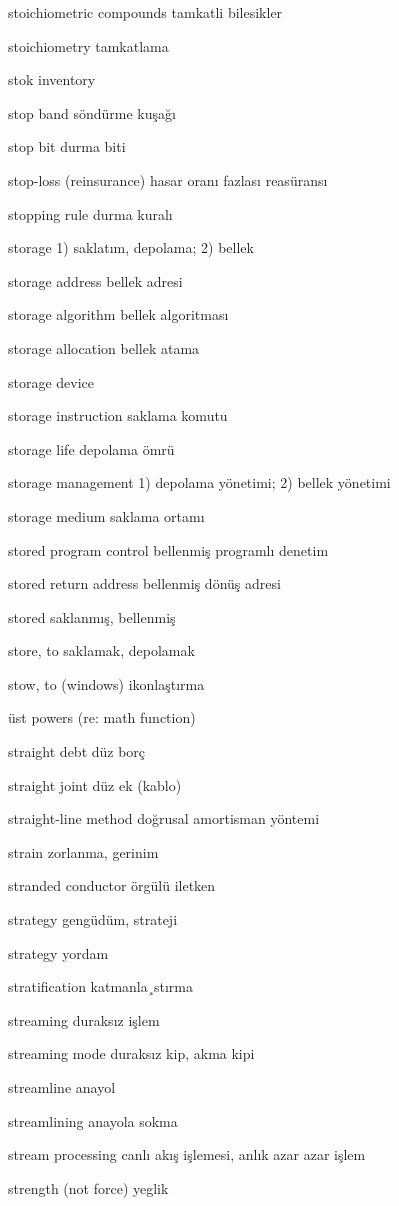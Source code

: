 \documentclass[12pt,fleqn]{article}\usepackage{../../common}
\begin{document}
stoichiometric compounds tamkatli bilesikler

stoichiometry tamkatlama

stok inventory

stop band söndürme kuşağı

stop bit durma biti

stop-loss (reinsurance) hasar oranı fazlası reasüransı

stopping rule durma kuralı

storage 1) saklatım, depolama; 2) bellek

storage address bellek adresi

storage algorithm bellek algoritması

storage allocation bellek atama

storage device

storage instruction saklama komutu

storage life depolama ömrü

storage management 1) depolama yönetimi; 2) bellek yönetimi

storage medium saklama ortamı

stored program control bellenmiş programlı denetim

stored return address bellenmiş dönüş adresi

stored saklanmış, bellenmiş

store, to saklamak, depolamak

stow, to (windows) ikonlaştırma

üst powers (re: math function)

straight debt düz borç

straight joint düz ek (kablo)

straight-line method doğrusal amortisman yöntemi

strain zorlanma, gerinim

stranded conductor örgülü iletken

strategy gengüdüm, strateji

strategy yordam

stratification katmanla¸stırma

streaming duraksız işlem

streaming mode duraksız kip, akma kipi

streamline anayol

streamlining anayola sokma

stream processing canlı akış işlemesi, anlık azar azar işlem

strength (not force) yeglik
\end{document}
